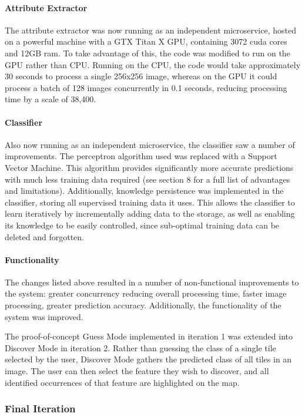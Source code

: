 \paragraph{Attribute Extractor\\}
The attribute extractor was now running as an independent microservice, hosted on a powerful machine with a GTX Titan X GPU, containing 3072 cuda cores and 12GB ram. To take advantage of this, the code was modified to run on the GPU rather than CPU. Running on the CPU, the code would take approximately 30 seconds to process a single 256x256 image, whereas on the GPU it could process a batch of 128 images concurrently in 0.1 seconds, reducing processing time by a scale of 38,400. 
\paragraph{Classifier\\} \label{ittwo-classifier}
Also now running as an independent microservice, the classifier saw a number of improvements. The perceptron algorithm used was replaced with a Support Vector Machine. This algorithm provides significantly more accurate predictions with much less training data required (see section 8 for a full list of advantages and limitations). Additionally, knowledge persistence was implemented in the classifier, storing all supervised training data it uses. This allows the classifier to learn iteratively by incrementally adding data to the storage, as well as enabling its knowledge to be easily controlled, since sub-optimal training data can be deleted and forgotten.
\paragraph{Functionality\\}
The changes listed above resulted in a number of non-functional improvements to the system: greater concurrency reducing overall processing time, faster image processing, greater prediction accuracy. Additionally, the functionality of the system was improved. 

The proof-of-concept Guess Mode implemented in iteration 1 was extended into Discover Mode in iteration 2. Rather than guessing the class of a single tile selected by the user, Discover Mode gathers the predicted class of all tiles in an image. The user can then select the feature they wish to discover, and all identified occurrences of that feature are highlighted on the map. 

\subsubsection{Final Iteration}
